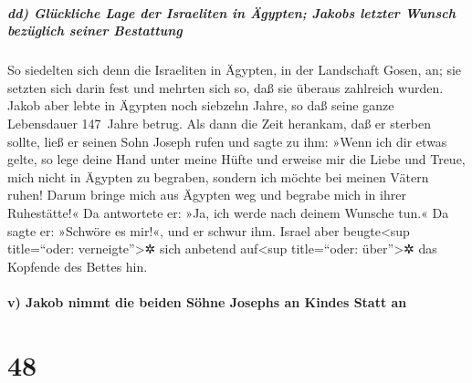 \hypertarget{dd-gluxfcckliche-lage-der-israeliten-in-uxe4gypten-jakobs-letzter-wunsch-bezuxfcglich-seiner-bestattung}{%
\subparagraph{dd) Glückliche Lage der Israeliten in Ägypten; Jakobs
letzter Wunsch bezüglich seiner
Bestattung}\label{dd-gluxfcckliche-lage-der-israeliten-in-uxe4gypten-jakobs-letzter-wunsch-bezuxfcglich-seiner-bestattung}}

 So siedelten sich denn die Israeliten in Ägypten, in der
Landschaft Gosen, an; sie setzten sich darin fest und mehrten sich so,
daß sie überaus zahlreich wurden.  Jakob aber lebte in
Ägypten noch siebzehn Jahre, so daß seine ganze Lebensdauer 147~Jahre
betrug.  Als dann die Zeit herankam, daß er sterben
sollte, ließ er seinen Sohn Joseph rufen und sagte zu ihm: »Wenn ich dir
etwas gelte, so lege deine Hand unter meine Hüfte und erweise mir die
Liebe und Treue, mich nicht in Ägypten zu begraben, 
sondern ich möchte bei meinen Vätern ruhen! Darum bringe mich aus
Ägypten weg und begrabe mich in ihrer Ruhestätte!« Da antwortete er:
»Ja, ich werde nach deinem Wunsche tun.«  Da sagte er:
»Schwöre es mir!«, und er schwur ihm. Israel aber beugte\textless sup
title=``oder: verneigte''\textgreater✲ sich anbetend auf\textless sup
title=``oder: über''\textgreater✲ das Kopfende des Bettes hin.

\hypertarget{v-jakob-nimmt-die-beiden-suxf6hne-josephs-an-kindes-statt-an}{%
\paragraph{v) Jakob nimmt die beiden Söhne Josephs an Kindes Statt
an}\label{v-jakob-nimmt-die-beiden-suxf6hne-josephs-an-kindes-statt-an}}

\hypertarget{section-47}{%
\section{48}\label{section-47}}

